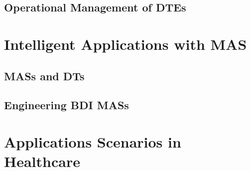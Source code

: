 \documentclass[12pt,a4paper,openright,twoside]{book}
\begin{document}


\chapter{Operational Management of \aclp{DTE}}
\label{chap:dte:dtc}



\part{Intelligent Applications with \acl{MAS}}
\label{part:mas}


\chapter{\aclp{MAS} and \aclp{DT}}
\label{chap:mas:mas-dt}



\chapter{Engineering \acs{BDI} \aclp{MAS}}
\label{chap:mas:engineering}




\part{Applications Scenarios in Healthcare}
\label{part:applications}
\end{document}
